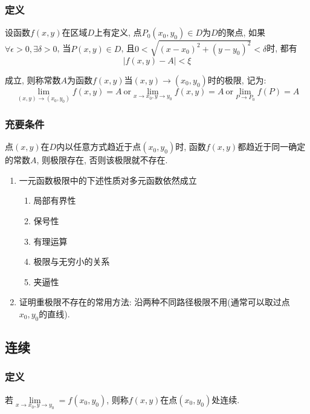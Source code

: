 \subsubsection{定义}
设函数$ f(x,y) $在区域$ D $上有定义, 点$ P_{0}(x_{0}, y_{0})\in D $为$ D $的聚点, 如果$ \forall \epsilon>0, \exists \delta>0 $, 当$ P(x,y)\in D $, 且$ 0<\sqrt{(x-x_{0})^{2}+(y-y_{0})^{2}}<\delta $时, 都有
\begin{equation*}
|f(x,y)-A|<\xi
\end{equation*}\par
成立, 则称常数$ A $为函数$ f(x,y) $当$ (x,y)\rightarrow (x_{0},y_{0}) $时的极限, 记为:
\begin{equation*}
\lim\limits_{(x,y) \rightarrow (x_{0},y_{0})}f(x,y)=A\ \mathrm{or} \lim\limits_{x \rightarrow x_{0}, y \rightarrow y_{0}}f(x,y)=A\ \mathrm{or} \lim\limits_{P \rightarrow P_{0}}f(P)=A
\end{equation*}
\subsubsection{充要条件}
点$ (x,y) $在$ D $内以任意方式趋近于点$ (x_{0},y_{0}) $时, 函数$ f(x,y) $都趋近于同一确定的常数$ A $, 则极限存在, 否则该极限就不存在.
\begin{tcolorbox}
\begin{enumerate}
\item 一元函数极限中的下述性质对多元函数依然成立
\begin{enumerate}
\item 局部有界性
\item 保号性
\item 有理运算
\item 极限与无穷小的关系
\item 夹逼性
\end{enumerate}
\item 证明重极限不存在的常用方法: 沿两种不同路径极限不用(通常可以取过点$ x_{0},y_{0} $的直线).
\end{enumerate}
\end{tcolorbox}
\subsection{连续}
\subsubsection{定义}
若$ \lim\limits_{x \rightarrow x_{0}, y\rightarrow y_{0}}=f(x_{0},y_{0}) $, 则称$ f(x,y) $在点$ (x_{0},y_{0}) $处连续.
